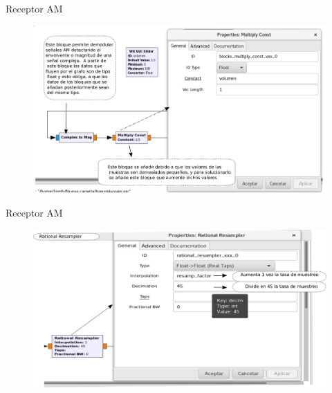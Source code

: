 \begin{frame}{Receptor AM}

\begin{figure}[H]
\centering
\vspace{-3mm}
\includegraphics[width=\textwidth]{parte3/lab16/pdf/lab16_5.pdf}

\end{figure}

\end{frame}

\begin{frame}{Receptor AM}

\begin{figure}[H]
\centering
\vspace{-3mm}
\includegraphics[width=\textwidth]{parte3/lab16/pdf/lab16_6.pdf}

\end{figure}

\end{frame}


